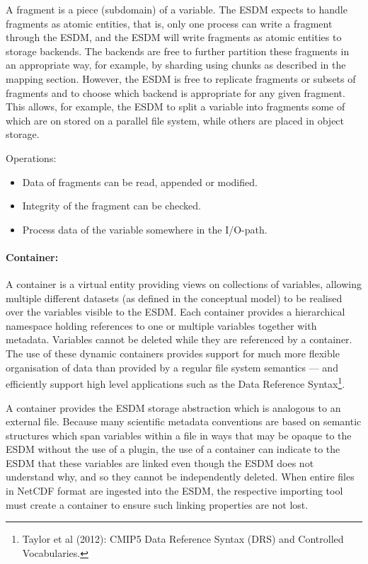 A fragment is a piece (subdomain) of a variable. The ESDM expects to
handle fragments as atomic entities, that is, only one process can write
a fragment through the ESDM, and the ESDM will write fragments as atomic
entities to storage backends. The backends are free to further partition
these fragments in an appropriate way, for example, by sharding using
chunks as described in the mapping section. However, the ESDM is free to
replicate fragments or subsets of fragments and to choose which backend
is appropriate for any given fragment. This allows, for example, the
ESDM to split a variable into fragments some of which are on stored on a
parallel file system, while others are placed in object storage.

Operations:

\begin{itemize}
  \item Data of fragments can be read, appended or modified.
  \item Integrity of the fragment can be checked.
  \item Process data of the variable somewhere in the I/O-path.
\end{itemize}

\paragraph{Container:}%
\label{container}

A container is a virtual entity providing views on collections of
variables, allowing multiple different datasets (as defined in the
conceptual model) to be realised over the variables visible to the ESDM.
Each container provides a hierarchical namespace holding references to
one or multiple variables together with metadata. Variables cannot be
deleted while they are referenced by a container. The use of these
dynamic containers provides support for much more flexible organisation
of data than provided by a regular file system semantics --- and
efficiently support high level applications such as the Data Reference
Syntax\footnote{Taylor et al (2012): CMIP5 Data Reference Syntax (DRS) and Controlled Vocabularies.}.

A container provides the ESDM storage abstraction which is analogous to
an external file. Because many scientific metadata conventions are based
on semantic structures which span variables within a file in ways that
may be opaque to the ESDM without the use of a plugin, the use of a
container can indicate to the ESDM that these variables are linked even
though the ESDM does not understand why, and so they cannot be
independently deleted. When entire files in NetCDF format are ingested
into the ESDM, the respective importing tool must create a container to
ensure such linking properties are not lost.

